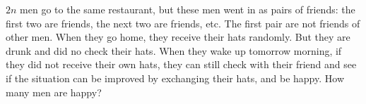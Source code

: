   $2n$ men go to the same restaurant, but these men went in as
  pairs of friends:
  the first two are friends, the next two are friends, etc.
  The first pair are not friends of other men.
  When they go home, they receive their hats randomly.
  But they are drunk and did no check their hats.
  When they wake up tomorrow morning, if they did not receive their own hats,
  they can still check with their friend and see if the situation can be improved
  by exchanging their hats, and be happy.
  How many men are happy?
